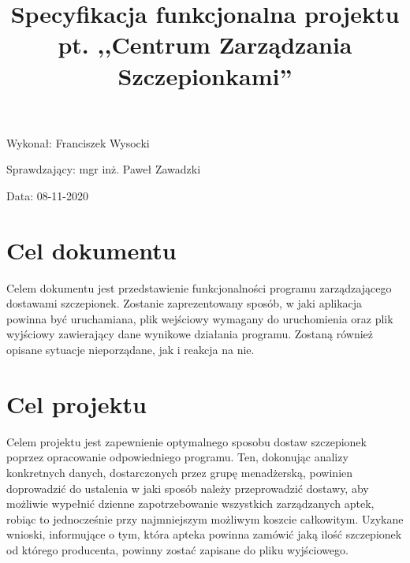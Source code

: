 \documentclass{article}
\title{Specyfikacja funkcjonalna projektu pt. ,,Centrum Zarządzania Szczepionkami''}
\author{}
\date{}
\begin{document}
\maketitle

\begin{flushright}
\par
\vfill
\par
{\fontsize{11}{11}\selectfont
    Wykonał: Franciszek Wysocki

    Sprawdzający: mgr inż. Paweł Zawadzki

    Data: 08-11-2020
}
\end{flushright}
\thispagestyle{empty}

\newpage

\tableofcontents

\newpage

\section{Cel dokumentu}
{\fontsize{12}{12}\selectfont

    Celem dokumentu jest przedstawienie funkcjonalności programu zarządzającego dostawami szczepionek. Zostanie zaprezentowany sposób, w jaki aplikacja powinna być uruchamiana, plik wejściowy wymagany do uruchomienia oraz plik wyjściowy zawierający dane wynikowe działania programu. Zostaną również opisane sytuacje nieporządane, jak i reakcja na nie.

}


\section{Cel projektu}
{\fontsize{12}{12}\selectfont
    Celem projektu jest zapewnienie optymalnego sposobu dostaw szczepionek poprzez opracowanie odpowiedniego programu. Ten, dokonując analizy konkretnych danych, dostarczonych przez grupę menadżerską, powinien doprowadzić do ustalenia w jaki sposób należy przeprowadzić dostawy, aby możliwie wypełnić dzienne zapotrzebowanie wszystkich zarządzanych aptek, robiąc to jednocześnie przy najmniejszym możliwym koszcie całkowitym.
    Uzykane wnioski, informujące o tym, która apteka powinna zamówić jaką ilość szczepionek od którego producenta, powinny zostać zapisane do pliku wyjściowego.

}
\end{document}
